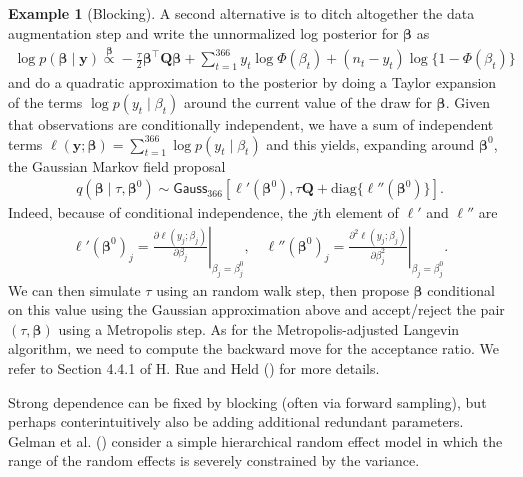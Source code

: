 \documentclass[
  11pt,
  letterpaper,
]{scrbook}
\theoremstyle{plain}
\theoremstyle{plain}
\theoremstyle{plain}
\theoremstyle{definition}
\theoremstyle{definition}
\newtheorem{example}{Example}[chapter]
\theoremstyle{definition}
\theoremstyle{remark}
\begin{document}
\begin{example}[Blocking]
A second alternative is to ditch altogether the data augmentation step
and write the unnormalized log posterior for \(\boldsymbol{\beta}\) as
\begin{align*}
 \log p(\boldsymbol{\beta} \mid \boldsymbol{y}) \stackrel{\boldsymbol{\beta}}{\propto} - \frac{\tau}{2} \boldsymbol{\beta}^\top \mathbf{Q} \boldsymbol{\beta} + \sum_{t=1}^{366} y_{t} \log \Phi(\beta_t) + (n_t-y_{t}) \log\{1-\Phi(\beta_t)\}
\end{align*} and do a quadratic approximation to the posterior by doing
a Taylor expansion of the terms \(\log p(y_{t} \mid \beta_{t})\) around
the current value of the draw for \(\boldsymbol{\beta}.\) Given that
observations are conditionally independent, we have a sum of independent
terms
\(\ell(\boldsymbol{y}; \boldsymbol{\beta}) = \sum_{t=1}^{366}\log p(y_t \mid \beta_t)\)
and this yields, expanding around \(\boldsymbol{\beta}^0\), the Gaussian
Markov field proposal \begin{align*}
q(\boldsymbol{\beta} \mid \tau, \boldsymbol{\beta}^0)  \sim \mathsf{Gauss}_{366}\left[\ell'(\boldsymbol{\beta}^0), \tau\mathbf{Q} + \mathrm{diag}\{\ell''(\boldsymbol{\beta}^0)\}\right].
\end{align*} Indeed, because of conditional independence, the \(j\)th
element of \(\ell'\) and \(\ell''\) are \begin{align*}
\ell'(\boldsymbol{\beta}^0)_j  = \left. \frac{\partial \ell(y_j; \beta_j)}{\partial \beta_j}\right|_{\beta_j = \beta_j^0}, \quad \ell''(\boldsymbol{\beta}^0)_j  = \left. \frac{\partial^2 \ell(y_j; \beta_j)}{\partial \beta_j^2}\right|_{\beta_j = \beta_j^0}.
\end{align*} We can then simulate \(\tau\) using an random walk step,
then propose \(\boldsymbol{\beta}\) conditional on this value using the
Gaussian approximation above and accept/reject the pair
\((\tau, \boldsymbol{\beta})\) using a Metropolis step. As for the
Metropolis-adjusted Langevin algorithm, we need to compute the backward
move for the acceptance ratio. We refer to Section 4.4.1 of H. Rue and
Held () for more details.

\end{example}

Strong dependence can be fixed by blocking (often via forward sampling),
but perhaps conterintuitively also be adding additional redundant
parameters. Gelman et al. () consider a
simple hierarchical random effect model in which the range of the random
effects is severely constrained by the variance.
\end{document}
